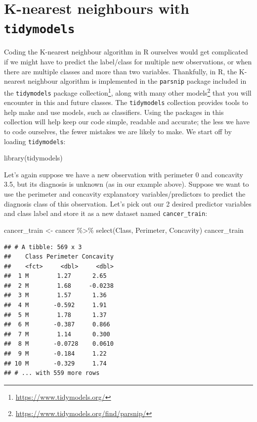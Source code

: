 \documentclass[
]{krantz}
\makeatletter
\newenvironment{Shaded}{\begin{snugshade}}{\end{snugshade}}
\newcommand{\FunctionTok}[1]{\textcolor[rgb]{0,0,0}{#1}}
\newcommand{\NormalTok}[1]{#1}
\newcommand{\OtherTok}[1]{\textcolor[rgb]{0.37,0.37,0.37}{#1}}
\newcommand{\SpecialCharTok}[1]{\textcolor[rgb]{0,0,0}{#1}}
\renewcommand{\href}[2]{#2\footnote{\url{#1}}}
\newenvironment{kframe}{%
\medskip{}
\setlength{\fboxsep}{.8em}
 \def\at@end@of@kframe{}%
 \ifinner\ifhmode%
  \def\at@end@of@kframe{\end{minipage}}%
  \begin{minipage}{\columnwidth}%
 \fi\fi%
 \def\FrameCommand##1{\hskip\@totalleftmargin \hskip-\fboxsep
 \colorbox{shadecolor}{##1}\hskip-\fboxsep
     \hskip-\linewidth \hskip-\@totalleftmargin \hskip\columnwidth}%
 \MakeFramed {\advance\hsize-\width
   \@totalleftmargin\z@ \linewidth\hsize
   \@setminipage}}%
 {\par\unskip\endMakeFramed%
 \at@end@of@kframe}
\renewenvironment{Shaded}{\begin{kframe}}{\end{kframe}}
\makeatother
\begin{document}
\hypertarget{k-nearest-neighbours-with-tidymodels}{%
\section{\texorpdfstring{K-nearest neighbours with \texttt{tidymodels}}{K-nearest neighbours with tidymodels}}\label{k-nearest-neighbours-with-tidymodels}}

Coding the K-nearest neighbour algorithm in R ourselves would get complicated
if we might have to predict the label/class for multiple new observations, or
when there are multiple classes and more than two variables. Thankfully, in R,
the K-nearest neighbour algorithm is implemented in the \texttt{parsnip} package
included in the
\href{https://www.tidymodels.org/}{\texttt{tidymodels} package collection}, along with
many \href{https://www.tidymodels.org/find/parsnip/}{other models}
that you will encounter in this and future classes. The \texttt{tidymodels} collection
provides tools to help make and use models, such as classifiers. Using the packages
in this collection will help keep our code simple, readable and accurate; the
less we have to code ourselves, the fewer mistakes we are likely to make. We
start off by loading \texttt{tidymodels}:

\begin{Shaded}
\begin{Highlighting}[]
\FunctionTok{library}\NormalTok{(tidymodels)}
\end{Highlighting}
\end{Shaded}

Let's again suppose we have a new observation with perimeter 0 and concavity
3.5, but its diagnosis is unknown (as in our example above). Suppose we
want to use the perimeter and concavity explanatory variables/predictors to
predict the diagnosis class of this observation. Let's pick out our 2 desired
predictor variables and class label and store it as a new dataset named \texttt{cancer\_train}:

\begin{Shaded}
\begin{Highlighting}[]
\NormalTok{cancer\_train }\OtherTok{\textless{}{-}}\NormalTok{ cancer }\SpecialCharTok{\%\textgreater{}\%}
  \FunctionTok{select}\NormalTok{(Class, Perimeter, Concavity)}
\NormalTok{cancer\_train}
\end{Highlighting}
\end{Shaded}

\begin{verbatim}
## # A tibble: 569 x 3
##    Class Perimeter Concavity
##    <fct>     <dbl>     <dbl>
##  1 M        1.27      2.65  
##  2 M        1.68     -0.0238
##  3 M        1.57      1.36  
##  4 M       -0.592     1.91  
##  5 M        1.78      1.37  
##  6 M       -0.387     0.866 
##  7 M        1.14      0.300 
##  8 M       -0.0728    0.0610
##  9 M       -0.184     1.22  
## 10 M       -0.329     1.74  
## # ... with 559 more rows
\end{verbatim}
\end{document}
